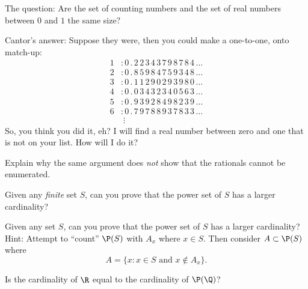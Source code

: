 \documentclass{ximera}
\begin{document}
\begin{question}
The question: Are the set of counting numbers and the set of real
numbers between $0$ and $1$ the same size?

Cantor's answer: Suppose they were, then you could make a one-to-one,
onto match-up:
\begin{align*}
1 &:0\,.\,2\,2\,3\,4\,3\,7\,9\,8\,7\,8\,4\,\dots\\
2 &:0\,.\,8\,5\,9\,8\,4\,7\,5\,9\,3\,4\,8\,\dots\\
3 &:0\,.\,1\,1\,2\,9\,0\,2\,9\,3\,9\,8\,0\,\dots\\
4 &:0\,.\,0\,3\,4\,3\,2\,3\,4\,0\,5\,6\,3\,\dots\\
5 &:0\,.\,9\,3\,9\,2\,8\,4\,9\,8\,2\,3\,9\,\dots\\
6 &:0\,.\,7\,9\,7\,8\,8\,9\,3\,7\,8\,3\,3\,\dots\\
  &\;\vdots
\end{align*}
So, you think you did it, eh?  I will find a real number between zero
and one that is not on your list.  How will I do it?
\end{question}

\begin{question}
Explain why the same argument does \textit{not} show that the
rationals cannot be enumerated.
\end{question}


\begin{question}
Given any \textit{finite} set $S$, can you prove that the power set of $S$ has a
larger cardinality?
\end{question}

\begin{question}
Given any set $S$, can you prove that the power set of $S$ has a
larger cardinality? Hint: Attempt to ``count'' $\P(S)$ with $A_x$ where
$x\in S$. Then consider $A \subset \P(S)$ where
\[
A = \{x : x \in S\text{ and } x\not\in A_x\}.
\]
\end{question}



\begin{exploration}
Is the cardinality of $\R$ equal to the cardinality of $\P(\Q)$?
\end{exploration}
\end{document}
